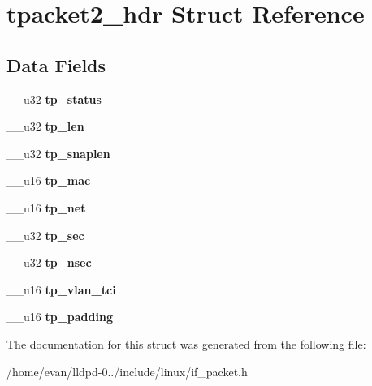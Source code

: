 \section{tpacket2\-\_\-hdr \-Struct \-Reference}
\label{structtpacket2__hdr}
\subsection*{\-Data \-Fields}
\begin{DoxyCompactItemize}
\item 
\-\_\-\-\_\-u32 {\bfseries tp\-\_\-status}\label{structtpacket2__hdr_af9d75e812fa4ac7875f4523632e504f7}

\item 
\-\_\-\-\_\-u32 {\bfseries tp\-\_\-len}\label{structtpacket2__hdr_abe67df7c04524b60f45a1ab757aec052}

\item 
\-\_\-\-\_\-u32 {\bfseries tp\-\_\-snaplen}\label{structtpacket2__hdr_a2a88b8ff6c0f5e97090acc008a23b9bf}

\item 
\-\_\-\-\_\-u16 {\bfseries tp\-\_\-mac}\label{structtpacket2__hdr_ae643e0917fc35773d760e2cd5a1bea22}

\item 
\-\_\-\-\_\-u16 {\bfseries tp\-\_\-net}\label{structtpacket2__hdr_a049ffb61207439057a2fcd60f11c47cb}

\item 
\-\_\-\-\_\-u32 {\bfseries tp\-\_\-sec}\label{structtpacket2__hdr_af7623d35c4e62d3adbcf538f2c020a61}

\item 
\-\_\-\-\_\-u32 {\bfseries tp\-\_\-nsec}\label{structtpacket2__hdr_af87f67531139327aafe58a3415817598}

\item 
\-\_\-\-\_\-u16 {\bfseries tp\-\_\-vlan\-\_\-tci}\label{structtpacket2__hdr_a40eeea5c6e481f5faa918c77eabd4a52}

\item 
\-\_\-\-\_\-u16 {\bfseries tp\-\_\-padding}\label{structtpacket2__hdr_a2edcf6706f5651f8f3ab45f995081b11}

\end{DoxyCompactItemize}


\-The documentation for this struct was generated from the following file\-:\begin{DoxyCompactItemize}
\item 
/home/evan/lldpd-\/0../include/linux/if\-\_\-packet.\-h\end{DoxyCompactItemize}
